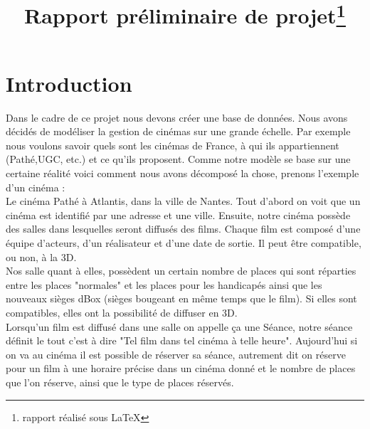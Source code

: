 \documentclass[a4paper,sffamily,12pt]{article}
\title{\vspace{\fill}\LARGE\bfseries\sffamily Rapport préliminaire de projet\protect\footnote{rapport réalisé sous \LaTeX} \vspace{\fill}}
\begin{document}
	\date{} %
	\maketitle %

	\thispagestyle{fancy} %
	
	\newpage
			
	\renewcommand{\contentsname}{Sommaire}
	\tableofcontents
	
	\newpage
	
	\section{Introduction}
		
		\vspace{0.5cm}
		
		Dans le cadre de ce projet nous devons créer une base de données. Nous avons décidés de modéliser la gestion de cinémas sur une grande échelle. Par exemple nous voulons savoir quels sont les cinémas de France, à qui ils appartiennent (Pathé,UGC, etc.) et ce qu'ils proposent. Comme notre modèle se base sur une certaine réalité voici comment nous avons décomposé la chose, prenons  l'exemple d'un cinéma : \\
		\indent Le cinéma Pathé à Atlantis, dans la ville de Nantes. Tout d'abord on voit que un cinéma est identifié par une adresse et une ville. Ensuite, notre cinéma possède des salles dans lesquelles seront diffusés des films. Chaque film est composé d'une équipe d'acteurs, d'un réalisateur et d'une date de sortie. Il peut être compatible, ou non, à la 3D. \\ 				\indent Nos salle quant à elles, possèdent un certain nombre de places qui sont réparties entre les places "normales" et les places pour les handicapés ainsi que les nouveaux sièges dBox (sièges bougeant en même temps que le film). Si elles sont compatibles, elles ont la possibilité de diffuser en 3D. \\
		\indent Lorsqu'un film est diffusé dans une salle on appelle ça une Séance, notre séance définit le tout c'est à dire "Tel film dans tel cinéma à telle heure". Aujourd'hui si on va au cinéma il est possible de réserver sa séance, autrement dit on réserve pour un film à une horaire précise dans un cinéma donné et le nombre de places que l'on réserve, ainsi que le type de places réservés. 
		
		\vspace{0.5cm}
		
\end{document}
